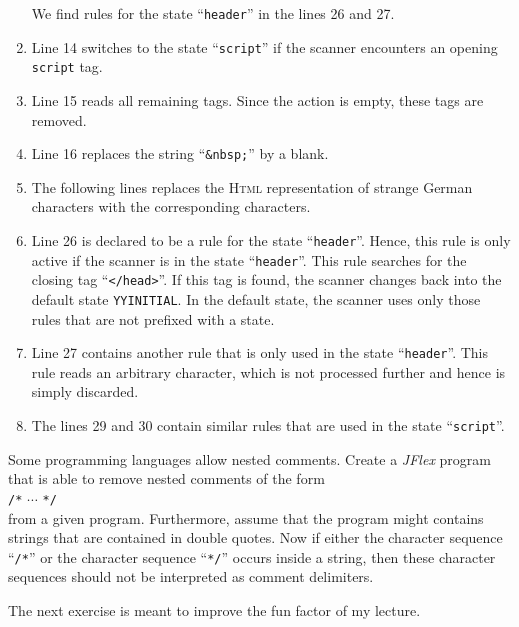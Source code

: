 \begin{enumerate}
      We find rules for the state ``\texttt{header}'' in the lines  26 and 27.
\item Line 14 switches to the state ``\texttt{script}'' if the scanner encounters an opening
      \texttt{script} tag.
\item Line  15 reads all remaining tags.  Since the action is empty, these tags are removed.
\item Line 16 replaces the string  ``\texttt{\&nbsp;}'' by a blank.
\item The following lines replaces the  \textsc{Html} representation of strange German characters with
      the corresponding characters.
\item Line 26 is declared to be a rule for the state ``\texttt{header}''.  Hence, this rule is only
      active if the scanner is in the state ``\texttt{header}''.  This rule searches for the closing tag
      ``\texttt{</head>}''.  If this tag is found, the scanner changes back into the default state
      \texttt{YYINITIAL}.  In the default state, the scanner uses only those rules that are not
      prefixed with a state. 
\item Line 27 contains another rule that is only used in the state  ``\texttt{header}''.
      This rule reads an arbitrary character, which is not processed further and hence is simply
      discarded. 
\item The lines  29 and 30 contain similar rules that are used in the state
      ``\texttt{script}''.
\end{enumerate}
\pagebreak

\exerciseEng
Some programming languages allow nested comments.  Create a \textsl{JFlex} program that is able to
remove nested comments of the form
\\[0.2cm]
\hspace*{1.3cm}
\texttt{/*} $\cdots$ \texttt{*/}
\\[0.2cm]
from a given program.  Furthermore, assume that the program might contains strings that are
contained in double quotes.  Now if either the character sequence ``\texttt{/*}'' or the character
sequence ``\texttt{*/}'' occurs inside a string, then these character sequences should not be
interpreted as comment delimiters. 
\eox
\vspace*{0.3cm}

The next exercise is meant to improve the fun factor of my lecture.

